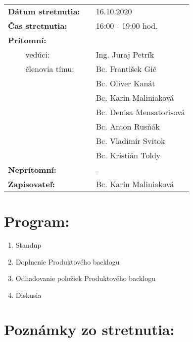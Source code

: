 \documentclass{article}
\begin{document}
    

    \begin{table}[h]
        \begin{tabular}{lllll}
            \multicolumn{3}{l}{\textbf{Dátum stretnutia:}} & & 16.10.2020 \\
            \multicolumn{3}{l}{\textbf{Čas stretnutia:}} & & 16:00 - 19:00 hod. \\
            \multicolumn{3}{l}{\textbf{Prítomní:}} \\
            & & vedúci: & & Ing. Juraj Petrík \\
            & & členovia tímu: & & Bc. František Gič  \\
            & & & & Bc. Oliver Kanát \\
            & & & & Bc. Karin Maliniaková \\
            & & & & Bc. Denisa Mensatorisová \\
            & & & & Bc. Anton Rusňák \\
            & & & & Bc. Vladimír Svitok \\
            & & & & Bc. Kristián Toldy \\
            \multicolumn{3}{l}{\textbf{Neprítomní:}} & & -\\
            \multicolumn{3}{l}{\textbf{Zapisovateľ:}} & & Bc. Karin Maliniaková \\
        \end{tabular}
        \label{tab:grades}
    \end{table}

    \section*{Program:}

    \begin{enumerate}
        \item Standup
        \item Doplnenie Produktového backlogu
        \item Odhadovanie položiek Produktového backlogu
        \item Diskusia
    \end{enumerate}

    \section*{Poznámky zo stretnutia:}
\end{document}
